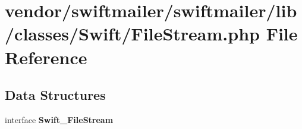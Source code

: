\section{vendor/swiftmailer/swiftmailer/lib/classes/\+Swift/\+File\+Stream.php File Reference}
\label{_file_stream_8php}
\subsection*{Data Structures}
\begin{DoxyCompactItemize}
\item 
interface {\bf Swift\+\_\+\+File\+Stream}
\end{DoxyCompactItemize}
